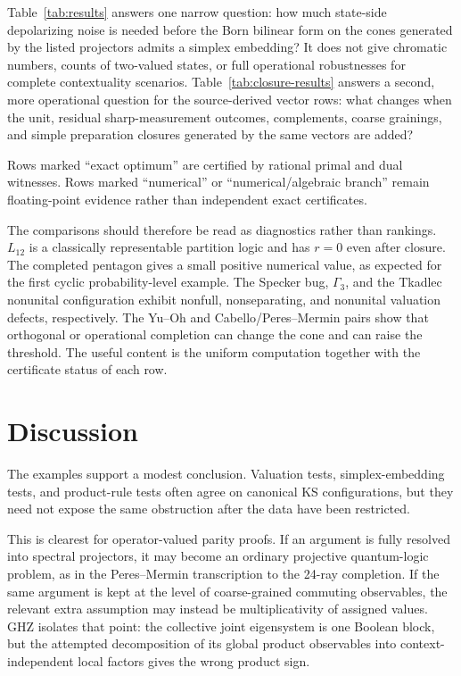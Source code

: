 \documentclass[aps,pra,twocolumn,superscriptaddress,nofootinbib]{revtex4-2}
\begin{document}
Table~\ref{tab:results} answers one narrow question: how much state-side depolarizing noise is needed before the Born bilinear form on the cones generated by the listed projectors admits a simplex embedding?  It does not give chromatic numbers, counts of two-valued states, or full operational robustnesses for complete contextuality scenarios.  Table~\ref{tab:closure-results} answers a second, more operational question for the source-derived vector rows: what changes when the unit, residual sharp-measurement outcomes, complements, coarse grainings, and simple preparation closures generated by the same vectors are added?

Rows marked ``exact optimum'' are certified by rational primal and dual witnesses.  Rows marked ``numerical'' or ``numerical/algebraic branch'' remain floating-point evidence rather than independent exact certificates.

The comparisons should therefore be read as diagnostics rather than rankings.  $L_{12}$ is a classically representable partition logic and has $r=0$ even after closure.  The completed pentagon gives a small positive numerical value, as expected for the first cyclic probability-level example.  The Specker bug, $\Gamma_3$, and the Tkadlec nonunital configuration exhibit nonfull, nonseparating, and nonunital valuation defects, respectively.  The Yu--Oh and Cabello/Peres--Mermin pairs show that orthogonal or operational completion can change the cone and can raise the threshold.  The useful content is the uniform computation together with the certificate status of each row.


\section{Discussion}
\label{sec:discussion}

The examples support a modest conclusion.  Valuation tests, simplex-embedding tests, and product-rule tests often agree on canonical KS configurations, but they need not expose the same obstruction after the data have been restricted.

This is clearest for operator-valued parity proofs.  If an argument is fully resolved into spectral projectors, it may become an ordinary projective quantum-logic problem, as in the Peres--Mermin transcription to the 24-ray completion.  If the same argument is kept at the level of coarse-grained commuting observables, the relevant extra assumption may instead be multiplicativity of assigned values.  GHZ isolates that point: the collective joint eigensystem is one Boolean block, but the attempted decomposition of its global product observables into context-independent local factors gives the wrong product sign.
\end{document}
